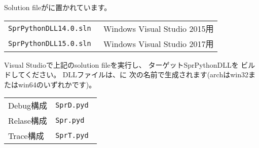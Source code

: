 \begin{narrow}
	Solution fileがに置かれています。

	\medskip
	\begin{narrow}[10pt]
	\begin{tabular}{l@{\ \ ---\ \ }l}\hline
		\tt{SprPythonDLL14.0.sln} & Windows Visual Studio 2015用 \\
		\tt{SprPythonDLL15.0.sln} & Windows Visual Studio 2017用 \\\hline
	\end{tabular}
	\end{narrow}

	\medskip
	Visual Studioで上記のsolution fileを実行し、
	ターゲットSprPythonDLLを ビルドしてください。
	DLLファイルは、に
	次の名前で生成されます(archはwin32またはwin64のいずれかです)。

	\medskip
	\begin{narrow}[10pt]
	\begin{tabular}{l@{\ \ ---\ \ }l}\hline
		Debug構成 & \tt{SprD.pyd} \\
		Relase構成 & \tt{Spr.pyd} \\
		Trace構成 & \tt{SprT.pyd} \\\hline
	\end{tabular}
	\end{narrow}
	\medskip
\end{narrow}

